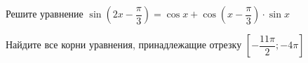 \begin{ex}
	\begin{condition}
		\begin{enumcols}[label=\asbuk*)]
			\item Решите уравнение \( \sin{\left( 2x -  \dfrac{\pi}{3} \right)}= \cos x+ \cos{\left(x - \dfrac{\pi}{3}\right)}\cdot\sin x  \)
			\item Найдите все корни уравнения, принадлежащие отрезку \(  \left[-\dfrac{11\pi}{2};-4\pi\right] \)
		\end{enumcols}
	\end{condition}
\end{ex}
